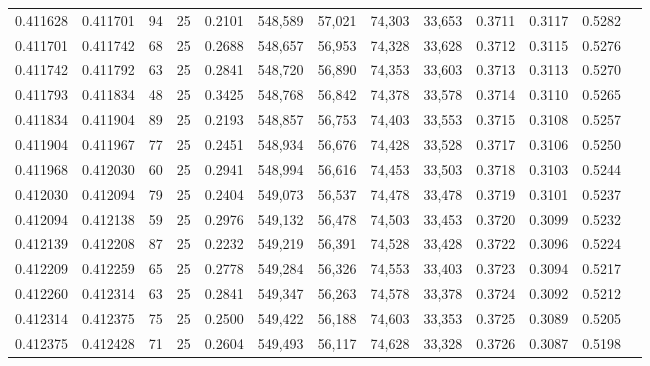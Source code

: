 \begin{tabular}{rrrrrrrrrrrrr}
0.411628 & 0.411701 &    94 &  25 &                                     0.2101 & 548,589 &  57,021 &  74,303 &  33,653 & 0.3711 & 0.3117 & 0.5282 \\
0.411701 & 0.411742 &    68 &  25 &                                     0.2688 & 548,657 &  56,953 &  74,328 &  33,628 & 0.3712 & 0.3115 & 0.5276 \\
0.411742 & 0.411792 &    63 &  25 &                                     0.2841 & 548,720 &  56,890 &  74,353 &  33,603 & 0.3713 & 0.3113 & 0.5270 \\
0.411793 & 0.411834 &    48 &  25 &                                     0.3425 & 548,768 &  56,842 &  74,378 &  33,578 & 0.3714 & 0.3110 & 0.5265 \\
0.411834 & 0.411904 &    89 &  25 &                                     0.2193 & 548,857 &  56,753 &  74,403 &  33,553 & 0.3715 & 0.3108 & 0.5257 \\
0.411904 & 0.411967 &    77 &  25 &                                     0.2451 & 548,934 &  56,676 &  74,428 &  33,528 & 0.3717 & 0.3106 & 0.5250 \\
0.411968 & 0.412030 &    60 &  25 &                                     0.2941 & 548,994 &  56,616 &  74,453 &  33,503 & 0.3718 & 0.3103 & 0.5244 \\
0.412030 & 0.412094 &    79 &  25 &                                     0.2404 & 549,073 &  56,537 &  74,478 &  33,478 & 0.3719 & 0.3101 & 0.5237 \\
0.412094 & 0.412138 &    59 &  25 &                                     0.2976 & 549,132 &  56,478 &  74,503 &  33,453 & 0.3720 & 0.3099 & 0.5232 \\
0.412139 & 0.412208 &    87 &  25 &                                     0.2232 & 549,219 &  56,391 &  74,528 &  33,428 & 0.3722 & 0.3096 & 0.5224 \\
0.412209 & 0.412259 &    65 &  25 &                                     0.2778 & 549,284 &  56,326 &  74,553 &  33,403 & 0.3723 & 0.3094 & 0.5217 \\
0.412260 & 0.412314 &    63 &  25 &                                     0.2841 & 549,347 &  56,263 &  74,578 &  33,378 & 0.3724 & 0.3092 & 0.5212 \\
0.412314 & 0.412375 &    75 &  25 &                                     0.2500 & 549,422 &  56,188 &  74,603 &  33,353 & 0.3725 & 0.3089 & 0.5205 \\
0.412375 & 0.412428 &    71 &  25 &                                     0.2604 & 549,493 &  56,117 &  74,628 &  33,328 & 0.3726 & 0.3087 & 0.5198 \\

\end{tabular}
